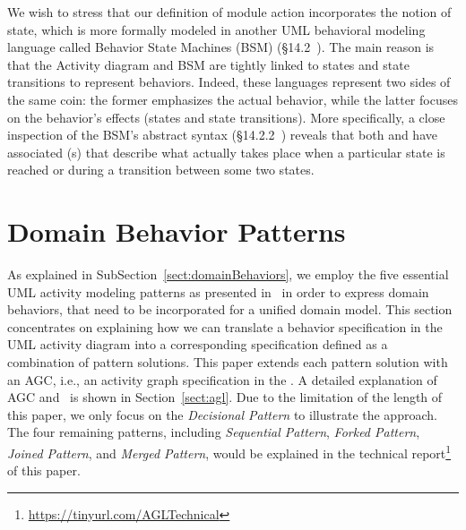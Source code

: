  We wish to stress that our definition of module action incorporates the notion of state, which is more formally modeled in another UML behavioral modeling language called Behavior State Machines (BSM) (\S{14.2}~\cite{omg_unified_2015}). The main reason is that the Activity diagram and BSM are tightly linked to states and state transitions to represent behaviors. Indeed, these languages represent two sides of the same coin: the former emphasizes the actual behavior, while the latter focuses on the behavior's effects (states and state transitions). More specifically, a close inspection of the BSM's abstract syntax (\S{14.2.2}~\cite{omg_unified_2015}) reveals that both  and  have associated (s) that describe what actually takes place when a particular state is reached or during a transition between some two states. %



\section{Domain Behavior Patterns}
\label{sect:behaviorPatterns}

As explained in SubSection~\ref{sect:domainBehaviors}, we employ the five essential UML activity modeling patterns as presented in~\cite{le_domain_2018} in order to express domain behaviors, that need to be incorporated for a unified domain model. This section concentrates on explaining how we can translate a behavior specification in the UML activity diagram into a corresponding specification defined as a combination of pattern solutions. This paper extends each pattern solution with an AGC, i.e., an activity graph specification in the \agl. A detailed explanation of AGC and \agl~is shown in Section~\ref{sect:agl}. Due to the limitation of the length of this paper, we only focus on the \textit{Decisional Pattern} to illustrate the approach. The four remaining patterns, including \textit{Sequential Pattern}, \textit{Forked Pattern}, \textit{Joined Pattern}, and \textit{Merged Pattern}, would be explained in the technical report\footnote{\url{https://tinyurl.com/AGLTechnical}} of this paper.

